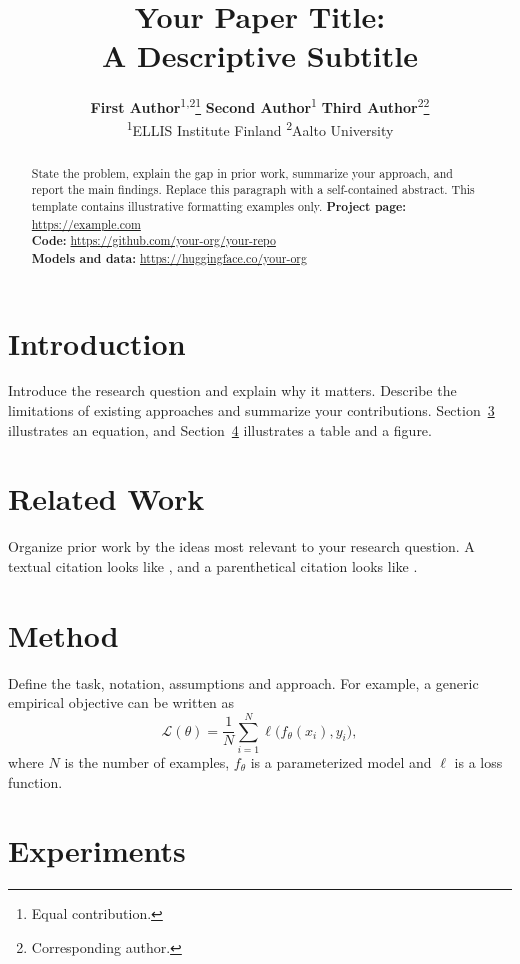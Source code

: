 \documentclass{article}
\title{Your Paper Title:\\A Descriptive Subtitle}
\author{\textbf{First Author}\textsuperscript{1,2}\thanks{Equal contribution.}\quad
  \textbf{Second Author}\textsuperscript{1}\footnotemark[1]\quad
  \textbf{Third Author}\textsuperscript{2}\thanks{Corresponding author.}\\[7pt]
  {\small\textsuperscript{1}ELLIS Institute Finland\quad
  \textsuperscript{2}Aalto University}}
\begin{document}
\maketitle

\begin{abstract}
State the problem, explain the gap in prior work, summarize your approach,
and report the main findings. Replace this paragraph with a self-contained
abstract. This template contains illustrative formatting examples only.
\tcblower
{\sffamily\bfseries Project page:} \url{https://example.com}\\
{\sffamily\bfseries Code:} \url{https://github.com/your-org/your-repo}\\
{\sffamily\bfseries Models and data:} \url{https://huggingface.co/your-org}
\end{abstract}

\section{Introduction}
\label{sec:introduction}
Introduce the research question and explain why it matters. Describe the
limitations of existing approaches and summarize your contributions.
Section~\ref{sec:method} illustrates an equation, and
Section~\ref{sec:experiments} illustrates a table and a figure.

\section{Related Work}
\label{sec:related}
Organize prior work by the ideas most relevant to your research question.
A textual citation looks like \citet{vaswani2017attention}, and a
parenthetical citation looks like \citep{vaswani2017attention}.

\section{Method}
\label{sec:method}
Define the task, notation, assumptions and approach. For example, a generic
empirical objective can be written as
\begin{equation}
  \mathcal{L}(\theta) = \frac{1}{N}\sum_{i=1}^{N}
  \ell\bigl(f_{\theta}(x_i),y_i\bigr),
  \label{eq:objective}
\end{equation}
where $N$ is the number of examples, $f_{\theta}$ is a parameterized model
and $\ell$ is a loss function.

\section{Experiments}
\label{sec:experiments}
\end{document}
